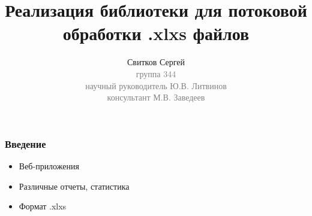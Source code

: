 \documentclass{beamer}
\begin{document}
\title{Реализация библиотеки для потоковой обработки .xlxs файлов}
\author{Свитков Сергей\\{\footnotesize\textcolor{gray}{группа 344\\научный руководитель Ю.В. Литвинов\\консультант М.В. Заведеев}}}
\frame{\titlepage}

\begin{frame}\frametitle{Введение}
\begin{itemize}
    \item Веб-приложения
    \item Различные отчеты, статистика
    \item Формат .xlxs
\end{itemize}
\end{frame}


\end{document}
